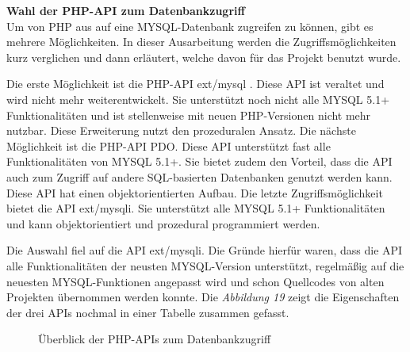 \textbf{Wahl der PHP-API zum Datenbankzugriff}\\
Um von PHP aus auf eine MYSQL-Datenbank zugreifen zu können, gibt es mehrere Möglichkeiten. In dieser Ausarbeitung werden die Zugriffsmöglichkeiten kurz verglichen und dann erläutert, welche davon für das Projekt benutzt wurde.

Die erste Möglichkeit ist die PHP-API \glqq ext/mysql \grqq{}. Diese API ist veraltet und wird nicht mehr weiterentwickelt. Sie unterstützt noch nicht alle MYSQL 5.1+ Funktionalitäten und ist stellenweise mit neuen PHP-Versionen nicht mehr nutzbar. Diese Erweiterung nutzt den prozeduralen Ansatz. Die nächste Möglichkeit ist die PHP-API \glqq PDO\grqq{}. Diese API unterstützt fast alle Funktionalitäten von MYSQL 5.1+. Sie bietet zudem den Vorteil, dass die API auch zum Zugriff auf andere SQL-basierten Datenbanken genutzt werden kann. Diese API hat einen objektorientierten Aufbau.  Die letzte Zugriffsmöglichkeit bietet die API \glqq ext/mysqli\grqq{}. Sie unterstützt alle MYSQL 5.1+ Funktionalitäten und kann objektorientiert und prozedural programmiert werden.

Die Auswahl fiel auf die API \glqq ext/mysqli\grqq{}. Die Gründe hierfür waren, dass die API alle Funktionalitäten der neusten MYSQL-Version unterstützt, regelmäßig auf die neuesten MYSQL-Funktionen angepasst wird und schon Quellcodes von alten Projekten übernommen werden konnte. Die \textit{Abbildung 19} zeigt die Eigenschaften der drei APIs nochmal in einer Tabelle zusammen gefasst.
\begin{figure}[H]
	\begin{center}
	\end{center}
	\caption{Überblick der PHP-APIs zum Datenbankzugriff}
\end{figure}

